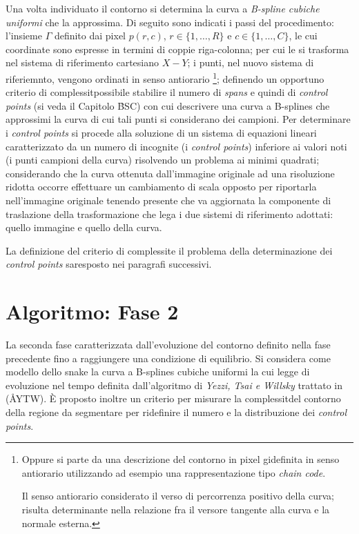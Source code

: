 Una volta individuato il contorno si determina la curva a {\it B-spline cubiche uniformi} che
la approssima.
Di seguito sono indicati i passi del procedimento:
\ben
\im l'insieme $\Gamma$ \e definito dai pixel $p(r,c)$, $r \in \{1,\dots,R\}$ e $c \in \{1,\dots,C\}$,
    le cui coordinate sono espresse in termini di coppie riga-colonna; per cui le si trasforma
    nel sistema di riferimento cartesiano $X-Y$;
\im i punti, nel nuovo sistema di riferiemnto, vengono ordinati in senso antiorario   
     \footnote{Oppure si parte da una descrizione del contorno in pixel gi\a definita
              in senso antiorario utilizzando ad esempio una rappresentazione tipo
              {\it chain code}.
     		  
     		  Il senso antiorario \e considerato il verso di percorrenza positivo della curva;
              risulta determinante nella relazione fra il versore tangente alla curva
              e la normale esterna.}; 
\im definendo un opportuno criterio di complessit\a \e possibile stabilire il numero di
    {\it spans} e quindi di {\it control points} (si veda il Capitolo \r{BSC}) 
    con cui descrivere una curva a B-splines che approssimi la curva di cui tali punti
    si considerano dei campioni. Per determinare i {\it control points} si procede alla
    soluzione di un sistema di equazioni lineari caratterizzato da un numero di incognite
    (i {\it control points}) inferiore ai valori noti (i punti campioni della curva)
    risolvendo un problema ai minimi quadrati;
\im considerando che la curva \e ottenuta dall'immagine originale ad una risoluzione ridotta
    occorre effettuare un cambiamento di scala opposto per riportarla
    nell'immagine originale tenendo presente che va aggiornata la componente di traslazione
    della trasformazione che lega i due sistemi di riferimento adottati: quello immagine
    e quello della curva.
\een

La definizione del criterio di complessit\a e il problema della determinazione dei 
{\it control points} sar\a esposto nei paragrafi successivi.

\section{Algoritmo: Fase 2}

La seconda fase \e caratterizzata dall'evoluzione del contorno definito nella fase
precedente fino a raggiungere una condizione di equilibrio. Si considera come modello dello
snake la curva a B-splines cubiche uniformi la cui legge di evoluzione nel tempo \e definita
dall'algoritmo di {\it Yezzi, Tsai e Willsky} trattato in (\r{AYTW}).
\`E proposto inoltre un criterio per misurare la complessit\a del contorno della regione
da segmentare per ridefinire il numero e la distribuzione dei {\it control points}.

